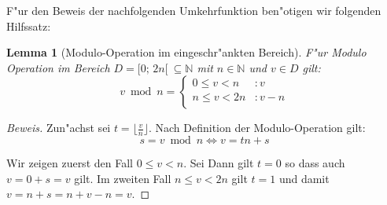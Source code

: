 \documentclass[a4paper]{article}
\numberwithin{equation}{section}
\newtheorem{lmm}{Lemma}
\begin{document}
F"ur den Beweis der nachfolgenden Umkehrfunktion ben"otigen wir folgenden
Hilfssatz:
\begin{lmm}[Modulo-Operation im eingeschr"ankten Bereich]\label{lmm:modulo}
  F"ur Modulo Operation im Bereich $D = [0;\,2n[\ \subseteq \mathbb{N}$ mit
  $n \in \mathbb{N}$ und $v \in D$ gilt:
  \begin{equation}
    v \bmod n = \left\{\begin{array}{ll}
        0 \le v < n & : v \\
        n \le v < 2n & : v - n \\
      \end{array}\right.
  \end{equation}
\end{lmm}
\begin{proof}[Beweis]
  Zun"achst sei $t = \lfloor\frac{v}{n}\rfloor$. Nach Definition der
  Modulo-Operation gilt:
  \begin{equation}s = v \bmod n \Longleftrightarrow v = tn + s\end{equation}

  \noindent Wir zeigen zuerst den Fall $0 \le v < n$. Sei Dann gilt $t = 0$ so
  dass auch $v = 0 + s = v$ gilt. Im zweiten Fall $n \le v < 2n$ gilt $t = 1$
  und damit $v = n + s = n + v - n = v$.
\end{proof}
\end{document}
